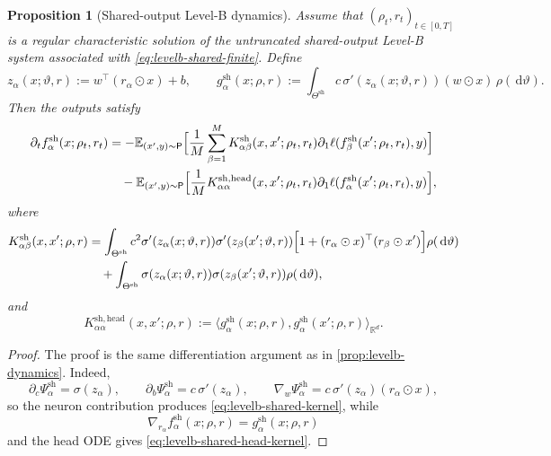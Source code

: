 \documentclass[11pt]{article}
\newtheorem{proposition}[theorem]{Proposition}
\theoremstyle{definition}
\newcommand{\R}{\mathbb{R}}
\newcommand{\E}{\mathbb{E}}
\newcommand{\dd}{\,\mathrm{d}}
\begin{document}
\begin{proposition}[Shared-output Level-B dynamics]
\label{prop:levelb-shared-dynamics}
Assume that $(\rho_t,r_t)_{t\in[0,T]}$ is a regular characteristic solution of the untruncated shared-output Level-B system associated with \eqref{eq:levelb-shared-finite}.
Define
\[
  z_\alpha(x;\vartheta,r):=w^\top(r_\alpha\odot x)+b,
  \qquad
  g_\alpha^{\mathrm{sh}}(x;\rho,r)
  :=
  \int_{\Theta^{\mathrm{sh}}}
  c\,\sigma'(z_\alpha(x;\vartheta,r))(w\odot x)
  \,\rho(\dd \vartheta).
\]
Then the outputs satisfy
\begin{align}
  \partial_t f_\alpha^{\mathrm{sh}}(x;\rho_t,r_t)
  &=
  -\E_{(x',y)\sim\mathsf P}
  \Bigl[
    \frac1M\sum_{\beta=1}^M
    K_{\alpha\beta}^{\mathrm{sh}}(x,x';\rho_t,r_t)
    \partial_1\ell(f_\beta^{\mathrm{sh}}(x';\rho_t,r_t),y)
  \Bigr]
  \nonumber\\
  &\quad
  -
  \E_{(x',y)\sim\mathsf P}
  \Bigl[
    \frac1M
    K_{\alpha\alpha}^{\mathrm{sh,head}}(x,x';\rho_t,r_t)
    \partial_1\ell(f_\alpha^{\mathrm{sh}}(x';\rho_t,r_t),y)
  \Bigr],
  \label{eq:levelb-shared-output-dynamics}
\end{align}
where
\begin{align}
  K_{\alpha\beta}^{\mathrm{sh}}(x,x';\rho,r)
  &=
  \int_{\Theta^{\mathrm{sh}}}
  c^2
  \sigma'(z_\alpha(x;\vartheta,r))
  \sigma'(z_\beta(x';\vartheta,r))
  \Bigl[
    1+(r_\alpha\odot x)^\top(r_\beta\odot x')
  \Bigr]
  \rho(\dd \vartheta)
  \nonumber\\
  &\quad
  +
  \int_{\Theta^{\mathrm{sh}}}
  \sigma(z_\alpha(x;\vartheta,r))
  \sigma(z_\beta(x';\vartheta,r))
  \rho(\dd \vartheta),
  \label{eq:levelb-shared-kernel}
\end{align}
and
\begin{equation}
  K_{\alpha\alpha}^{\mathrm{sh,head}}(x,x';\rho,r)
  :=
  \langle g_\alpha^{\mathrm{sh}}(x;\rho,r),g_\alpha^{\mathrm{sh}}(x';\rho,r)\rangle_{\R^d}.
  \label{eq:levelb-shared-head-kernel}
\end{equation}
\end{proposition}

\begin{proof}
The proof is the same differentiation argument as in \cref{prop:levelb-dynamics}.
Indeed,
\[
  \partial_c\Psi_\alpha^{\mathrm{sh}}=\sigma(z_\alpha),
  \qquad
  \partial_b\Psi_\alpha^{\mathrm{sh}}=c\,\sigma'(z_\alpha),
  \qquad
  \nabla_w\Psi_\alpha^{\mathrm{sh}}=c\,\sigma'(z_\alpha)(r_\alpha\odot x),
\]
so the neuron contribution produces \eqref{eq:levelb-shared-kernel}, while
\[
  \nabla_{r_\alpha}f_\alpha^{\mathrm{sh}}(x;\rho,r)=g_\alpha^{\mathrm{sh}}(x;\rho,r)
\]
and the head ODE gives \eqref{eq:levelb-shared-head-kernel}.
\end{proof}
\end{document}
